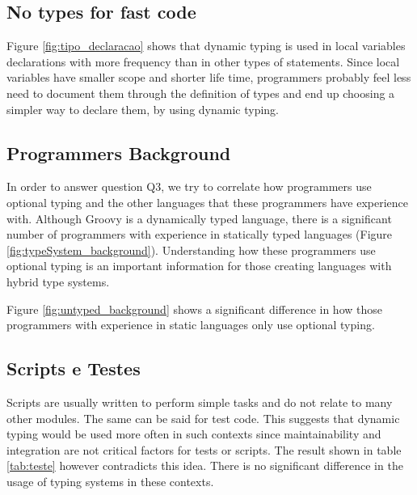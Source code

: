 \documentclass[preprint]{sigplanconf}
\begin{document}
\subsection{No types for fast code}
Figure \ref{fig:tipo_declaracao} shows that dynamic typing is used in local variables declarations with more frequency than in other types of statements.
Since local variables have smaller scope and shorter life time, programmers probably feel less need to document them through the definition of types and end up choosing a simpler way to declare them, by using dynamic typing.


\subsection{Programmers Background}
In order to answer question Q3, we try to correlate how programmers use optional typing and the other languages that these programmers have experience with. 
Although Groovy is a dynamically typed language, there is a significant number of programmers with experience in statically typed languages (Figure \ref{fig:typeSystem_background}).
Understanding how these programmers use optional typing is an important information for those creating languages with hybrid type systems.

Figure \ref{fig:untyped_background} shows a significant difference in how those programmers with experience in static languages only use optional typing.




\subsection{Scripts e Testes\label{sub:Scripts-e-Testes}}
Scripts are usually written to perform simple tasks and do not relate to many other modules. 
The same can be said for test code. 
This suggests that dynamic typing would be used more often in such contexts since maintainability and integration are not critical factors for tests or scripts. 
The result shown in table \ref{tab:teste} however contradicts this idea.
There is no significant difference in the usage of typing systems in these contexts.











%
%
\end{document}
